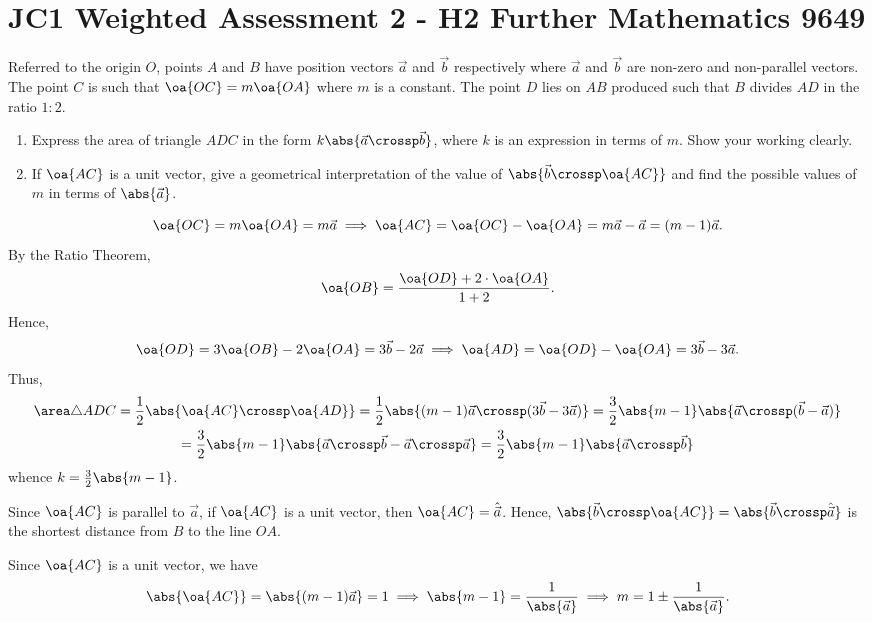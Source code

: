 \section{JC1 Weighted Assessment 2 - H2 Further Mathematics 9649}

\begin{problem}
    Referred to the origin $O$, points $A$ and $B$ have position vectors $\vec a$ and $\vec b$ respectively where $\vec a$ and $\vec b$ are non-zero and non-parallel vectors. The point $C$ is such that $\oa{OC} = m \oa{OA}$ where $m$ is a constant. The point $D$ lies on $AB$ produced such that $B$ divides $AD$ in the ratio $1 : 2$.

    \begin{enumerate}
        \item Express the area of triangle $ADC$ in the form $k \abs{\vec a \crossp \vec b}$, where $k$ is an expression in terms of $m$. Show your working clearly.
        \item If $\oa{AC}$ is a unit vector, give a geometrical interpretation of the value of $\abs{\vec b \crossp \oa{AC}}$ and find the possible values of $m$ in terms of $\abs{\vec a}$.
    \end{enumerate}
\end{problem}
\begin{solution}
    \begin{ppart}
        \[\oa{OC} = m\oa{OA} = m \vec a \implies \oa{AC} = \oa{OC} - \oa{OA} = m \vec a - \vec a = (m-1) \vec a.\] By the Ratio Theorem, \[\oa{OB} = \frac{\oa{OD} + 2 \cdot \oa{OA}}{1 + 2}.\] Hence, \[\oa{OD} = 3\oa{OB} - 2\oa{OA} = 3\vec b - 2 \vec a \implies \oa{AD} = \oa{OD} - \oa{OA} = 3\vec b - 3\vec a.\] Thus,
        \begin{gather*}
            \area \triangle ADC = \frac12 \abs{\oa{AC} \crossp \oa{AD}} = \frac12 \abs{(m-1)\vec a \crossp (3\vec b - 3\vec a)} = \frac32 \abs{m-1} \abs{\vec a \crossp (\vec b - \vec a)}\\
            = \frac32 \abs{m-1} \abs{\vec a \crossp \vec b - \vec a \crossp \vec a} = \frac32 \abs{m-1} \abs{\vec a \crossp \vec b}
        \end{gather*}
        whence $k = \frac32 \abs{m-1}$.
    \end{ppart}
    \begin{ppart}
        Since $\oa{AC}$ is parallel to $\vec a$, if $\oa{AC}$ is a unit vector, then $\oa{AC} = \hat{\vec a}$. Hence, $\abs{\vec b \crossp \oa{AC}} = \abs{\vec b \crossp \hat{\vec a}}$ is the shortest distance from $B$ to the line $OA$.

        Since $\oa{AC}$ is a unit vector, we have \[\abs{\oa{AC}} = \abs{(m-1) \vec a} = 1 \implies \abs{m-1} = \frac1{\abs{\vec a}} \implies m = 1 \pm \frac1{\abs{\vec a}}.\]
    \end{ppart}
\end{solution}

